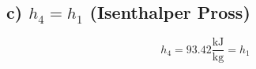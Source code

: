 \subsection*{c) $h_4 = h_1$ (Isenthalper Pross)}

\[
h_4 = 93.42 \frac{\text{kJ}}{\text{kg}} = h_1
\]